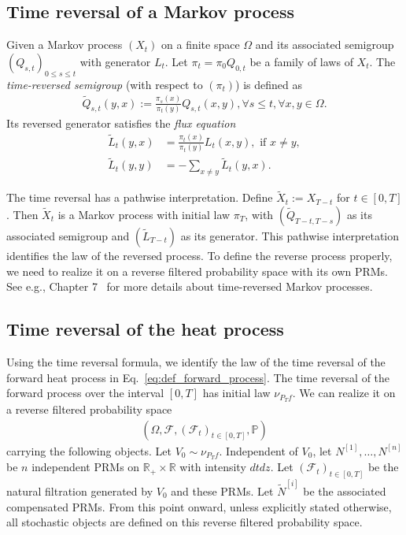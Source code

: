 \documentclass[11pt]{article}
\newcommand{\sF}{\mathscr{F}}
\newcommand{\uV}{V}
\newcommand{\wNi}{\widetilde{N}^{[i]}}
\theoremstyle{named}
\theoremstyle{plain}
\newcommand{\defn}{:=}
\newcommand{\real}{\ensuremath{\mathbb{R}}}
\newcommand{\Prob}{\ensuremath{{\mathbb{P}}}}
\newcommand{\parenth}[1]{\left( #1 \right)}
\begin{document}
\subsection{Time reversal of a Markov process}
Given a Markov process $(X_t)$ on a finite space $\Omega$ and its associated semigroup $(Q_{s, t})_{0 \leq s \leq t}$ with generator $L_t$. Let $\pi_t = \pi_0 Q_{0, t}$ be a family of laws of $X_t$. The \textit{time-reversed semigroup} (with respect to $(\pi_t)$) is defined as
\begin{align*}
  \widetilde{Q}_{s,t}(y, x) \defn \frac{\pi_s(x)}{\pi_t(y)} Q_{s, t} (x, y), \forall s \leq t, \forall x, y \in \Omega.
\end{align*}
Its reversed generator satisfies the \textit{flux equation}
\begin{align*}
  \tilde{L}_t(y, x) &= \frac{\pi_t(x)}{\pi_t(y)} L_t(x, y), \text{ if } x \neq y, \\
  \tilde{L}_t(y, y) &= - \sum_{x \neq y} \tilde{L}_t(y, x).
\end{align*}

The time reversal has a pathwise interpretation. Define $\widetilde{X}_{t} \defn X_{T-t}$ for $t \in [0, T]$. Then $\widetilde{X}_t$ is a Markov process with initial law $\pi_T$, with $\parenth{\widetilde{Q}_{T-t,T-s}}$ as its associated semigroup and $\parenth{\tilde{L}_{T-t}}$ as its generator. This pathwise interpretation identifies the law of the reversed process. To define the reverse process properly, we need to realize it on a reverse filtered probability space with its own PRMs. See e.g., Chapter 7~\cite{anderson2012continuous} for more details about time-reversed Markov processes. 

\subsection{Time reversal of the heat process}
Using the time reversal formula, we identify the law of the time reversal of the forward heat process in Eq.~\eqref{eq:def_forward_process}. The time reversal of the forward process over the interval $[0, T]$ has initial law $\nu_{P_T f}$. We can realize it on a reverse filtered probability space 
\begin{align*}
  \parenth{\Omega, \sF, \parenth{\sF_t}_{t \in [0, T]}, \Prob}
\end{align*}
carrying the following objects. Let $\uV_0 \sim \nu_{P_T f}$. Independent of $\uV_0$, let $N^{[1]}, \ldots, N^{[n]}$ be $n$ independent PRMs on $\real_+ \times \real$ with intensity $dt dz$. Let $(\sF_t)_{t \in [0, T]}$ be the natural filtration generated by $\uV_0$ and these PRMs. Let $\wNi$ be the associated compensated PRMs. From this point onward, unless explicitly stated otherwise, all stochastic objects are defined on this reverse filtered probability space.
\end{document}
